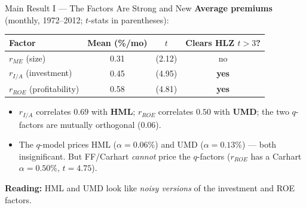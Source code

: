 \documentclass{beamer}
\begin{document}
\begin{frame}{Main Result I --- The Factors Are Strong and New}
	\textbf{Average premiums} (monthly, 1972--2012; $t$-stats in parentheses):
	\begin{center}
		\small
		\begin{tabular}{@{}lccc@{}}
			\toprule
			Factor & Mean (\%/mo) & $t$ & Clears HLZ $t>3$? \\
			\midrule
			$r_{ME}$ (size)            & 0.31 & (2.12) & no \\
			$r_{I/A}$ (investment)     & 0.45 & (4.95) & \textbf{yes} \\
			$r_{ROE}$ (profitability)  & 0.58 & (4.81) & \textbf{yes} \\
			\bottomrule
		\end{tabular}
	\end{center}
	\begin{itemize}
		\item $r_{I/A}$ correlates $0.69$ with \textbf{HML}; $r_{ROE}$ correlates $0.50$ with \textbf{UMD}; the two $q$-factors are mutually orthogonal ($0.06$).
		\item The $q$-model prices HML ($\alpha=0.06\%$) and UMD ($\alpha=0.13\%$) --- both insignificant. But FF/Carhart \textit{cannot} price the $q$-factors ($r_{ROE}$ has a Carhart $\alpha=0.50\%$, $t=4.75$).
	\end{itemize}
	\textbf{Reading:} HML and UMD look like \textit{noisy versions} of the investment and ROE factors.
\end{frame}
\end{document}
